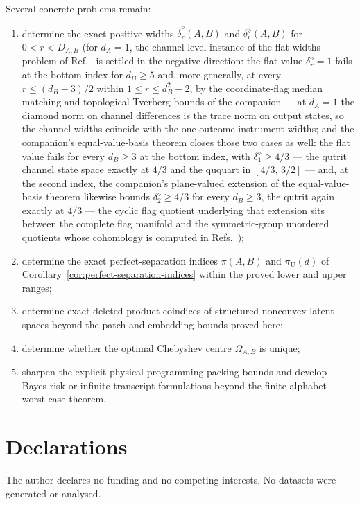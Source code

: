\documentclass[11pt,a4paper]{article}
\theoremstyle{definition}
\theoremstyle{plain}
\theoremstyle{remark}
\begin{document}
Several concrete problems remain:
\begin{enumerate}
\item determine the exact positive widths
$\widetilde\delta_r^\diamond(A,B)$ and $\delta_r^\diamond(A,B)$ for
$0<r<D_{A,B}$ (for $d_A=1$, the channel-level instance of the flat-widths problem of
Ref.~\cite{CompanionInstruments} is settled in the negative direction: the flat value
$\delta_r^\diamond=1$ fails at the bottom index for $d_B\ge5$ and, more generally,
at every $r\le(d_B-3)/2$ within $1\le r\le d_B^2-2$, by the coordinate-flag median
matching and topological Tverberg bounds of the companion --- at $d_A=1$ the diamond
norm on channel differences is the trace norm on output states, so the channel widths
coincide with the one-outcome instrument widths; and the companion's equal-value-basis theorem closes those two cases as well: the flat
value fails for every $d_B\ge3$ at the bottom index, with $\delta_1^\diamond\ge4/3$ ---
the qutrit channel state space exactly at $4/3$ and the ququart in $[4/3,\,3/2]$ --- and, at the second index, the companion's plane-valued extension of the equal-value-basis theorem likewise bounds $\delta_2^\diamond\ge4/3$ for every $d_B\ge3$, the qutrit again exactly at $4/3$ --- the cyclic flag quotient underlying that extension sits between the complete flag manifold and the symmetric-group unordered quotients whose cohomology is computed in Refs.~\cite{GuerraJana2025,GuerraJanaMaiti2025});
\item determine the exact perfect-separation indices $\pi(A,B)$ and
$\pi_{\mathrm U}(d)$ of Corollary~\ref{cor:perfect-separation-indices}
within the proved lower and upper ranges;
\item determine exact deleted-product coindices of structured nonconvex latent
spaces beyond the patch and embedding bounds proved here;
\item determine whether the optimal Chebyshev centre $\Omega_{A,B}$ is unique;
\item sharpen the explicit physical-programming packing bounds and develop
Bayes-risk or infinite-transcript formulations beyond the finite-alphabet
worst-case theorem.
\end{enumerate}

\section*{Declarations}
The author declares no funding and no competing interests. No datasets were generated or analysed.
\end{document}
